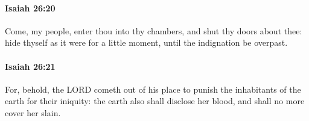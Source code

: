		\paragraph{Isaiah 26:20} %
			\label{ISAIAH-26-20}

			Come, my people, enter thou into thy chambers, and shut thy doors about thee: hide thyself as it were for a little moment, until the indignation be overpast.


		\paragraph{Isaiah 26:21} %
			\label{ISAIAH-26-21}

			For, behold, the LORD cometh out of his place to punish the inhabitants of the earth for their iniquity: the earth also shall disclose her blood, and shall no more cover her slain.

